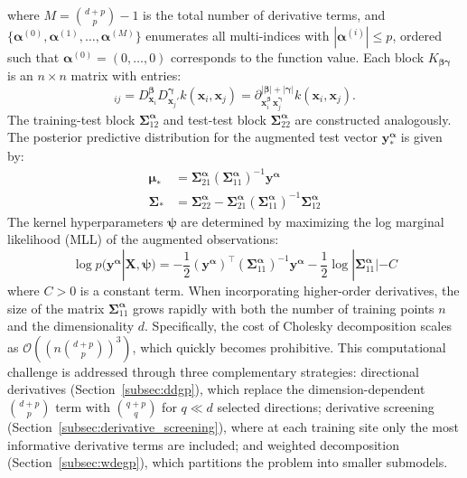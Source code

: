 \documentclass[12pt]{article}
\begin{document}
where $M = \binom{d+p}{p} - 1$ is the total number of derivative terms, and $\{\boldsymbol{\alpha}^{(0)}, \boldsymbol{\alpha}^{(1)}, \ldots, \boldsymbol{\alpha}^{(M)}\}$ enumerates all multi-indices with $|\boldsymbol{\alpha}^{(i)}| \leq p$, ordered such that $\boldsymbol{\alpha}^{(0)} = (0,\ldots,0)$ corresponds to the function value. Each block $K_{\boldsymbol{\beta}\boldsymbol{\gamma}}$ is an $n \times n$ matrix with entries:
\begin{equation}
	[K_{\boldsymbol{\beta}\boldsymbol{\gamma}}]_{ij} = D_{\mathbf{x}_i}^{\boldsymbol{\beta}} D_{\mathbf{x}_j'}^{\boldsymbol{\gamma}} k(\mathbf{x}_i, \mathbf{x}_j) = \partial^{|\boldsymbol{\beta}| + |\boldsymbol{\gamma}|}_{\mathbf{x}_i^{\boldsymbol{\beta}}\,\mathbf{x}_j^{\boldsymbol{\gamma}}} k(\mathbf{x}_i, \mathbf{x}_j).
\end{equation}
The training-test block $\boldsymbol{\Sigma}^{\boldsymbol{\alpha}}_{12}$ and test-test block $\boldsymbol{\Sigma}^{\boldsymbol{\alpha}}_{22}$ are constructed analogously. The posterior predictive distribution for the augmented test vector $\mathbf{y}^{\boldsymbol{\alpha}}_*$ is given by:
\begin{equation}
	\label{eqn:full_dek_posterior}
	\begin{split}
		\boldsymbol{\mu}_{*} &= \boldsymbol{\Sigma}^{\boldsymbol{\alpha}}_{21} \left(\boldsymbol{\Sigma}^{\boldsymbol{\alpha}}_{11}\right)^{-1} \mathbf{y}^{\boldsymbol{\alpha}} \\
		\boldsymbol{\Sigma}_{*} &=  \boldsymbol{\Sigma}^{\boldsymbol{\alpha}}_{22} - \boldsymbol{\Sigma}^{\boldsymbol{\alpha}}_{21} \left(\boldsymbol{\Sigma}^{\boldsymbol{\alpha}}_{11}\right)^{-1} \boldsymbol{\Sigma}^{\boldsymbol{\alpha}}_{12}
	\end{split}
\end{equation}
The kernel hyperparameters $\boldsymbol{\psi}$ are determined by maximizing the log marginal likelihood (MLL) of the augmented observations:
\begin{equation}
	\label{eqn:dek_mll}
	\log p(\mathbf{y}^{\boldsymbol{\alpha}}|\mathbf{X}, \boldsymbol{\psi}) = -\frac{1}{2} \left(\mathbf{y}^{\boldsymbol{\alpha}}\right)^\top \left(\boldsymbol{\Sigma}^{\boldsymbol{\alpha}}_{11}\right)^{-1} \mathbf{y}^{\boldsymbol{\alpha}} - \frac{1}{2}\log|\boldsymbol{\Sigma}^{\boldsymbol{\alpha}}_{11}| - C
\end{equation}
where $C > 0$ is a constant term. When incorporating higher-order derivatives, the size of the matrix $\boldsymbol{\Sigma}^{\boldsymbol{\alpha}}_{11}$ grows rapidly with both the number of training points $n$ and the dimensionality $d$. Specifically, the cost of Cholesky decomposition scales as $\mathcal{O}\left(\left(n \binom{d + p}{p}\right)^3\right)$, which quickly becomes prohibitive. This computational challenge is addressed through three complementary strategies: directional derivatives (Section~\ref{subsec:ddgp}), which replace the dimension-dependent $\binom{d+p}{p}$ term with $\binom{q+p}{q}$ for $q \ll d$ selected directions; derivative screening (Section~\ref{subsec:derivative_screening}), where at each training site only the most informative derivative terms are included; and weighted decomposition (Section~\ref{subsec:wdegp}), which partitions the problem into smaller submodels.
\end{document}
